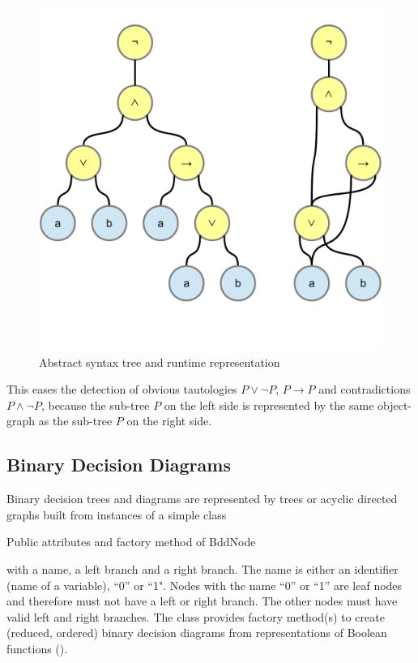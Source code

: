 \begin{figure}[htbp]
\begin{center}
\includegraphics[scale=0.5,trim=0cm 2.9cm 0cm 1cm,clip=true]{diagrams/AcyclicSyntaxGraph.pdf}
\caption{Abstract syntax tree and runtime representation}
\label{fig:AcyclicSyntaxGraph}
\end{center}
\end{figure}

This eases the detection of obvious tautologies $P \vee \neg P$, $P \rightarrow P$ and contradictions $P \wedge \neg P$,
because the sub-tree $P$ on the left side is represented by the same object-graph as the sub-tree $P$ on the right side.

\subsection{Binary Decision Diagrams}

Binary decision trees and diagrams are represented by trees or acyclic directed graphs built from instances of a simple class
\begin{table}[htdp]
\begin{center}
\caption{Public attributes and factory method of BddNode}
\label{fig:BddNode}
\end{center}
\end{table}
 with a name, a left branch and a right branch. The name is either an identifier (name of a variable), “0” or “1". 
Nodes with the name “0” or “1” are leaf nodes and therefore must not have a left or right branch.
The other nodes must have valid left and right branches. The class provides factory method(s) to create 
(reduced, ordered) binary decision diagrams from representations of Boolean functions
().


